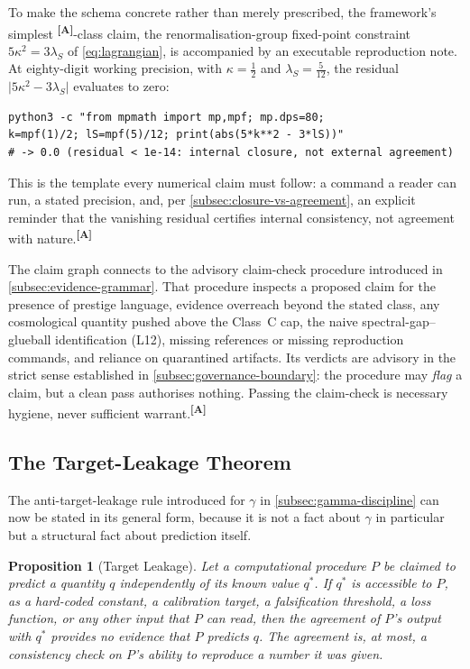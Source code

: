 \documentclass[12pt,a4paper,twoside]{article}
\theoremstyle{plain}
\newtheorem{proposition}[theorem]{Proposition}
\theoremstyle{definition}
\theoremstyle{remark}
\newcommand{\catmark}[1]{\textsuperscript{\textsf{\textbf{[#1]}}}}
\begin{document}
To make the schema concrete rather than merely prescribed, the framework's simplest \catmark{A}-class claim, the renormalisation-group fixed-point constraint $5\kappa^2 = 3\lambda_S$ of \cref{eq:lagrangian}, is accompanied by an executable reproduction note. At eighty-digit working precision, with $\kappa = \tfrac{1}{2}$ and $\lambda_S = \tfrac{5}{12}$, the residual $\lvert 5\kappa^2 - 3\lambda_S\rvert$ evaluates to zero:
\begin{verbatim}
python3 -c "from mpmath import mp,mpf; mp.dps=80;
k=mpf(1)/2; lS=mpf(5)/12; print(abs(5*k**2 - 3*lS))"
# -> 0.0 (residual < 1e-14: internal closure, not external agreement)
\end{verbatim}
This is the template every numerical claim must follow: a command a reader can run, a stated precision, and, per \cref{subsec:closure-vs-agreement}, an explicit reminder that the vanishing residual certifies internal consistency, not agreement with nature.\catmark{A}

The claim graph connects to the advisory claim-check procedure introduced in \cref{subsec:evidence-grammar}. That procedure inspects a proposed claim for the presence of prestige language, evidence overreach beyond the stated class, any cosmological quantity pushed above the Class~C cap, the naive spectral-gap--glueball identification (L12), missing references or missing reproduction commands, and reliance on quarantined artifacts. Its verdicts are advisory in the strict sense established in \cref{subsec:governance-boundary}: the procedure may \emph{flag} a claim, but a clean pass authorises nothing. Passing the claim-check is necessary hygiene, never sufficient warrant.\catmark{A}

\subsection{The Target-Leakage Theorem}
\label{subsec:target-leakage-theorem}

The anti-target-leakage rule introduced for $\gamma$ in \cref{subsec:gamma-discipline} can now be stated in its general form, because it is not a fact about $\gamma$ in particular but a structural fact about prediction itself.

\begin{proposition}[Target Leakage]
\label{prop:target-leakage}
Let a computational procedure $P$ be claimed to predict a quantity $q$ independently of its known value $q^{\ast}$. If $q^{\ast}$ is accessible to $P$, as a hard-coded constant, a calibration target, a falsification threshold, a loss function, or any other input that $P$ can read, then the agreement of $P$'s output with $q^{\ast}$ provides no evidence that $P$ predicts $q$. The agreement is, at most, a consistency check on $P$'s ability to reproduce a number it was given.
\end{proposition}
\end{document}
